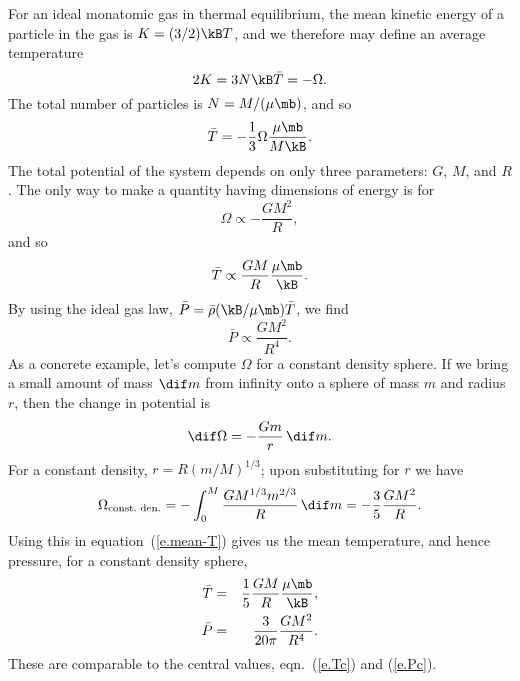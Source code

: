 For an ideal monatomic gas in thermal equilibrium, the mean kinetic energy of a particle in the gas is $K = (3/2)\kB T$, and we therefore may define an average temperature
\begin{equation}\label{e.Tbar}
	2 K = 3 N\kB \bar{T} = -\Omega.
\end{equation}
The total number of particles is $N=M/(\mu\mb)$, and so
\begin{equation}\label{e.mean-T}
\bar{T} = -\frac{1}{3}\Omega\frac{\mu\mb}{M\kB}.
\end{equation}
The total potential of the system depends on only three parameters: $G$, $M$, and $R$.  The only way to make a quantity having dimensions of energy is for
\[ \Omega \propto -\frac{GM^{2}}{R}, \]
and so
\[ \bar{T} \propto \frac{GM}{R}\frac{\mu\mb}{\kB}.  \]
By using the ideal gas law, $\bar{P} = \bar{\rho}(\kB/\mu\mb)\bar{T}$, we find
\[ \bar{P} \propto \frac{GM^{2}}{R^{4}}. \]
As a concrete example, let's compute $\Omega$ for a constant density sphere.
If we bring a small amount of mass $\dif m$ from infinity onto a sphere of mass $m$ and radius $r$, then the change in potential is \[ \dif\Omega = -\frac{Gm}{r}\,\dif m. \]
For a constant density, $r = R(m/M)^{1/3}$; upon substituting for $r$ we have
\begin{equation}\label{e.energy-constant-density-sphere}
	\Omega_{\textrm{const.\ den.}} = - \int_{0}^{M}\frac{GM^{1/3} m^{2/3}}{R}\,\dif m = -\frac{3}{5}\frac{GM^{2}}{R}.
\end{equation}
Using this in equation~(\ref{e.mean-T}) gives us the mean temperature, and hence pressure, for a constant density sphere,
\begin{eqnarray}\label{e.mean-T-rho}
\bar{T} &=& \frac{1}{5}\frac{GM}{R}\frac{\mu\mb}{\kB},\\
\label{e.mean-P}
\bar{P} &=& \frac{3}{20\pi}\frac{GM^{2}}{R^{4}}.
\end{eqnarray}
These are comparable to the central values, eqn.~(\ref{e.Tc}) and (\ref{e.Pc}).

